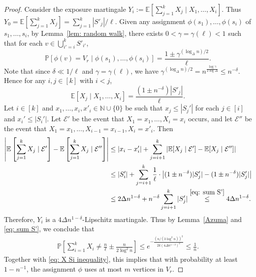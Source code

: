 \documentclass[a4paper, 11pt, reqno]{amsart}
\numberwithin{equation}{section}
\newcommand{\1}{{\rm 1\hspace*{-0.4ex}%
\rule{0.1ex}{1.52ex}\hspace*{0.2ex}}}
\newcommand{\N}{\mathbb N}
\newcommand{\cE}{\mathcal{E}}
\newcommand{\Pro}{\mathbb{P}}
\newcommand{\Exp}{\mathbb{E}}
\begin{document}
\begin{proof}
Consider the exposure martingale $Y_i:= \mathbb{E}[\sum_{j=1}^{k} X_j \mid X_1,\dots, X_i]$. 
Thus $Y_0=\Exp[\sum_{j=1}^{k} X_j ]=\sum_{j=1}^{k} |S'_j|/\ell$.
Given any assignment $\phi(s_1),\ldots,\phi(s_i)$ of $s_1,\ldots,s_i$, 
by Lemma~\ref{lem: random walk}, 
there exists $0<\gamma=\gamma(\ell) <1$ such that for each $v\in \bigcup_{i'=i}^{k} S'_{i'}$, 
$$\mathbb{P}[\phi(v)=V_r \mid \phi(s_1),\ldots,\phi(s_i)] 
= \frac{1 \pm \gamma^{(\log_{\Delta}n)/2}}{\ell}.$$
Note that since $\delta \ll 1/\ell$ and $\gamma=\gamma(\ell)$, we have $\gamma^{(\log_{\Delta}n)/2} = n^{\frac{\log{\gamma}}{2\log{\Delta}}}\leq n^{-\delta}$.
Hence for any $i,j\in [k]$ with $i<j$,
$$
\mathbb{E}[X_j\mid  X_1,\dots, X_i] = \frac{(1 \pm n^{-\delta})|S'_j|}{\ell}.
$$
Let $i\in [k]$ and $x_1,\dots, x_i, x'_i\in \N\cup \{0\}$ be
such that $x_j\leq |S_j'|$ for each $j\in [i]$ and $x_i'\leq |S_i'|$.
Let $\cE'$ be the event that $X_1=x_1,\dots, X_{i}=x_i$ occurs, and let $\cE''$ be the event that $X_1=x_1,\dots, X_{i-1}=x_{i-1}, X_i=x'_i$.
Then
\begin{align*}
 \left|\mathbb{E}\left[\sum_{j=1}^{k}X_j \mid \cE'\right] - \mathbb{E}\left[\sum_{j=1}^{k}X_j\mid \cE''\right]\right| 
&\leq |x_i-x'_i| + \sum_{j=i+1}^{k} \left|\mathbb{E}[X_j \mid \cE'] - \mathbb{E}[X_j \mid \cE''] \right| \\
 &\leq |S'_i| + \sum_{j=i+1}^{k} \frac{1}{\ell} \cdot \left|(1 \pm n^{-\delta})|S'_j| - (1 \pm n^{-\delta})|S'_j|\right| \\
&\leq 2 \Delta n^{1-\delta} +  n^{-\delta} \sum_{j=i+1}^{k} |S'_j|
 \stackrel{\eqref{eq: sum S'}}{\leq} 4\Delta n^{1-\delta}. 
 \end{align*}
Therefore, $Y_i$ is a $4\Delta n^{1-\delta}$-Lipschitz martingale.
Thus by Lemma~\ref{Azuma} and \eqref{eq: sum S'}, 
we conclude that
\begin{align*}%
\Pro\left[\sum_{i=1}^{k} X_i \neq  \frac{n}{\ell} \pm \frac{n}{2\log^2{n}} \right]
\leq   e^{-\frac{ (n/(3\log^2{n}))^{2} }{2k (4\Delta n^{1-\delta})^2}} \leq \frac{1}{n}.
\end{align*}
Together with \eqref{eq: X Si inequality}, this implies that with probability at least $1- n^{-1}$, the assignment $\phi$ uses at most $m$ vertices in $V_r$. 


\end{proof}
\end{document}
